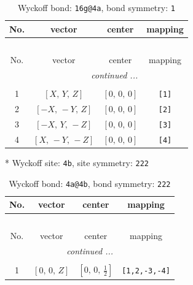 \documentclass[fleqn,8pt]{jsarticle}
\begin{document}
\begin{longtable}{cccc}
\caption{Wyckoff bond: {\tt 16g@4a}, bond symmetry: {\tt 1}}
 \\
 \hline \hline
No. & vector & center & mapping \\ \hline \endfirsthead

\multicolumn{3}{l}{\tablename\ \thetable{}} \\
 \hline \hline
No. & vector & center & mapping \\ \hline \endhead

 \hline \hline
\multicolumn{3}{r}{\footnotesize\it continued ...} \\ \endfoot

 \hline \hline
\multicolumn{3}{r}{} \\ \endlastfoot

1 & $\left[ X,\, Y,\, Z \right]$ & $\left[ 0,\, 0,\, 0 \right]$ & {\tt [1]} \\ \hline
2 & $\left[ - X,\, - Y,\, Z \right]$ & $\left[ 0,\, 0,\, 0 \right]$ & {\tt [2]} \\ \hline
3 & $\left[ - X,\, Y,\, - Z \right]$ & $\left[ 0,\, 0,\, 0 \right]$ & {\tt [3]} \\ \hline
4 & $\left[ X,\, - Y,\, - Z \right]$ & $\left[ 0,\, 0,\, 0 \right]$ & {\tt [4]} \\
\end{longtable}
* Wyckoff site: {\tt 4b}, site symmetry: {\tt 222}
\renewcommand{\arraystretch}{1.2}
\begin{longtable}{cccc}
\caption{Wyckoff bond: {\tt 4a@4b}, bond symmetry: {\tt 222}}
 \\
 \hline \hline
No. & vector & center & mapping \\ \hline \endfirsthead

\multicolumn{3}{l}{\tablename\ \thetable{}} \\
 \hline \hline
No. & vector & center & mapping \\ \hline \endhead

 \hline \hline
\multicolumn{3}{r}{\footnotesize\it continued ...} \\ \endfoot

 \hline \hline
\multicolumn{3}{r}{} \\ \endlastfoot

1 & $\left[ 0,\, 0,\, Z \right]$ & $\left[ 0,\, 0,\, \frac{1}{2} \right]$ & {\tt [1,2,-3,-4]} \\
\end{longtable}
\renewcommand{\arraystretch}{1.2}
\end{document}
